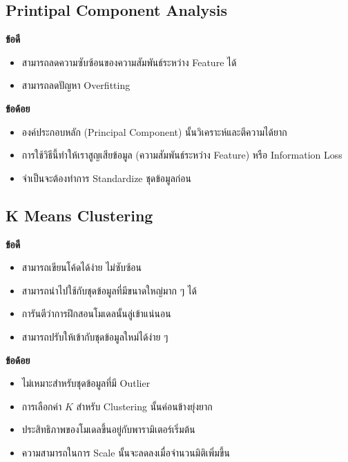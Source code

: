 \subsection{Printipal Component Analysis}
\label{ssec:pros_cons_pca}

\noindent \textbf{ข้อดี}
\begin{itemize}[topsep=0pt]
    \item สามารถลดความซับซ้อนของความสัมพันธ์ระหว่าง Feature ได้
    
    \item สามารถลดปัญหา Overfitting
\end{itemize}

\noindent \textbf{ข้อด้อย}
\begin{itemize}[topsep=0pt]
    \item องค์ประกอบหลัก (Principal Component) นั้นวิเคราะห์และตีความได้ยาก
    
    \item การใช้วิธีนี้ทำให้เราสูญเสียข้อมูล (ความสัมพันธ์ระหว่าง Feature) หรือ Information Loss
    
    \item จำเป็นจะต้องทำการ Standardize ชุดข้อมูลก่อน
\end{itemize}

\subsection{K Means Clustering}
\label{ssec:pros_cons_kmeans}

\noindent \textbf{ข้อดี}
\begin{itemize}[topsep=0pt]
    \item สามารถเขียนโค้ดได้ง่าย ไม่ซับซ้อน
    
    \item สามารถนำไปใช้กับชุดข้อมูลที่มีขนาดใหญ่มาก ๆ ได้
    
    \item การันตีว่าการฝึกสอนโมเดลนั้นลู่เข้าแน่นอน
    
    \item สามารถปรับให้เข้ากับชุดข้อมูลใหม่ได้ง่าย ๆ
\end{itemize}

\noindent \textbf{ข้อด้อย}
\begin{itemize}[topsep=0pt]
    \item ไม่เหมาะสำหรับชุดข้อมูลที่มี Outlier
    
    \item การเลือกค่า $K$ สำหรับ Clustering นั้นค่อนข้างยุ่งยาก
    
    \item ประสิทธิภาพของโมเดลขึ้นอยู่กับพารามิเตอร์เริ่มต้น
    
    \item ความสามารถในการ Scale นั้นจะลดลงเมื่อจำนวนมิติเพิ่มขึ้น
\end{itemize}

